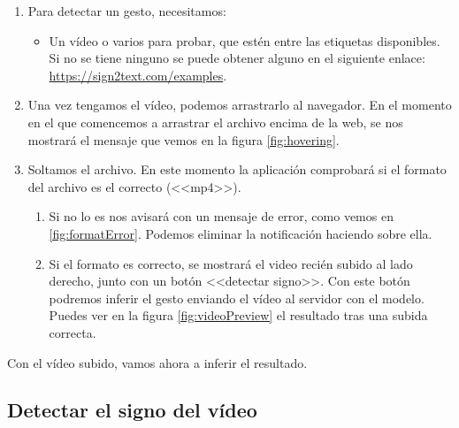 \begin{enumerate}
  \item Para detectar un gesto, necesitamos:

        \begin{itemize}
          \item Un vídeo o varios para probar, que estén entre las etiquetas disponibles. Si no se tiene ninguno se puede obtener alguno en el siguiente enlace: \url{https://sign2text.com/examples}.
        \end{itemize}

  \item Una vez tengamos el vídeo, podemos arrastrarlo al navegador. En el momento en el que comencemos a arrastrar el archivo encima de la web, se nos mostrará el mensaje que vemos en la figura \ref{fig:hovering}.


  \item Soltamos el archivo. En este momento la aplicación comprobará si el formato del archivo es el correcto (<<mp4>>).

        \begin{enumerate}
          \item Si no lo es nos avisará con un mensaje de error, como vemos en \ref{fig:formatError}. Podemos eliminar la notificación haciendo  sobre ella.


          \item Si el formato es correcto, se mostrará el video recién subido al lado derecho, junto con un botón <<detectar signo>>. Con este botón podremos inferir el gesto enviando el vídeo al servidor con el modelo. Puedes ver en la figura \ref{fig:videoPreview} el resultado tras una subida correcta.

        \end{enumerate}
\end{enumerate}


Con el vídeo subido, vamos ahora a inferir el resultado.

\subsection{Detectar el signo del vídeo}

